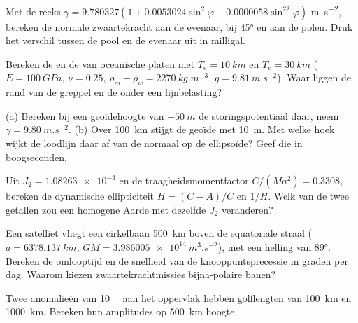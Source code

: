\begin{exercise}[$\star$]\label{exo:b3:gravity-geodesy:3}
Met de reeks $\gamma = 9.780327(1 + 0.0053024\sin^2\varphi -
0.0000058\sin^22\varphi)$ \unit{m.s^{-2}}, bereken de normale zwaartekracht aan de evenaar,
bij \ang{45} en aan de polen. Druk het verschil tussen de pool en de evenaar uit in
milligal.
\end{exercise}

\begin{exercise}[$\star$]\label{exo:b3:gravity-geodesy:4}
Bereken de  en de  van oceanische platen met
$T_e = \qty{10}{km}$ en $T_e = \qty{30}{km}$ ($E = \qty{100}{GPa}$,
$\nu = 0.25$, $\rho_m - \rho_w = \qty{2270}{kg.m^{-3}}$, $g =
\qty{9.81}{m.s^{-2}}$). Waar liggen de rand van de greppel en de  onder een
lijnbelasting?
\end{exercise}

\begin{exercise}[$\star\star$]\label{exo:b3:gravity-geodesy:5}
(a) Bereken bij een geoïdehoogte van $+\qty{50}{m}$ de storingspotentiaal daar,
neem $\gamma = \qty{9.80}{m.s^{-2}}$. (b) Over \qty{100}{km} stijgt de geoïde
met \qty{10}{m}. Met welke hoek wijkt de loodlijn daar af van de normaal op
de ellipsoïde? Geef die in boogseconden.
\end{exercise}

\begin{exercise}[$\star\star$]\label{exo:b3:gravity-geodesy:6}
Uit $J_2 = \num{1.08263e-3}$ en de traagheidsmomentfactor
$C/(Ma^2) = \num{0.3308}$, bereken de dynamische ellipticiteit $H = (C - A)/C$ en
$1/H$. Welk van de twee getallen zou een homogene Aarde met dezelfde $J_2$ veranderen?
\end{exercise}

\begin{exercise}[$\star\star$]\label{exo:b3:gravity-geodesy:7}
Een satelliet vliegt een cirkelbaan \qty{500}{km} boven de equatoriale straal
($a = \qty{6378.137}{km}$, $GM = \qty{3.986005e14}{m^3.s^{-2}}$), met een helling van
\ang{89}. Bereken de omlooptijd en de snelheid van de knooppuntsprecessie in graden per dag.
Waarom kiezen zwaartekrachtmissies bijna-polaire banen?
\end{exercise}

\begin{exercise}[$\star\star$]\label{exo:b3:gravity-geodesy:8}
Twee anomalieën van \qty{10}{\milli\gal} aan het oppervlak hebben golflengten van
\qty{100}{km} en \qty{1000}{km}. Bereken hun amplitudes op \qty{500}{km}
hoogte.
\end{exercise}

